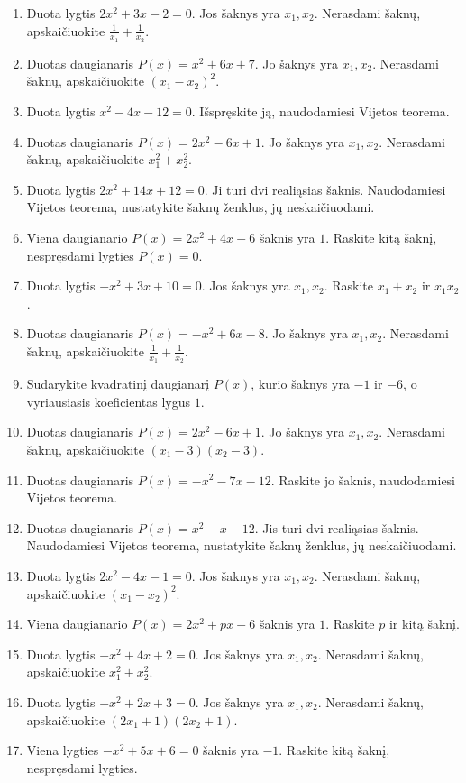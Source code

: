 \documentclass[11pt,a4paper]{article}
\begin{document}
\begin{enumerate}
\item Duota lygtis \(2x^2+3x-2=0\). Jos šaknys yra \(x_1,x_2\). Nerasdami šaknų, apskaičiuokite \mbox{\(\frac1{x_1}+\frac1{x_2}\)}.
\item Duotas daugianaris \(P(x)=x^2+6x+7\). Jo šaknys yra \(x_1,x_2\). Nerasdami šaknų, apskaičiuokite \mbox{\((x_1-x_2)^2\)}.
\item Duota lygtis \(x^2-4x-12=0\). Išspręskite ją, naudodamiesi Vijetos teorema.
\item Duotas daugianaris \(P(x)=2x^2-6x+1\). Jo šaknys yra \(x_1,x_2\). Nerasdami šaknų, apskaičiuokite \mbox{\(x_1^2+x_2^2\)}.
\item Duota lygtis \(2x^2+14x+12=0\). Ji turi dvi realiąsias šaknis. Naudodamiesi Vijetos teorema, nustatykite šaknų ženklus, jų neskaičiuodami.
\item Viena daugianario \(P(x)=2x^2+4x-6\) šaknis yra \(1\). Raskite kitą šaknį, nespręsdami lygties \(P(x)=0\).
\item Duota lygtis \(-x^2+3x+10=0\). Jos šaknys yra \(x_1,x_2\). Raskite \(x_1+x_2\) ir \(x_1x_2\).
\item Duotas daugianaris \(P(x)=-x^2+6x-8\). Jo šaknys yra \(x_1,x_2\). Nerasdami šaknų, apskaičiuokite \mbox{\(\frac1{x_1}+\frac1{x_2}\)}.
\item Sudarykite kvadratinį daugianarį \(P(x)\), kurio šaknys yra \(-1\) ir \(-6\), o vyriausiasis koeficientas lygus \(1\).
\item Duotas daugianaris \(P(x)=2x^2-6x+1\). Jo šaknys yra \(x_1,x_2\). Nerasdami šaknų, apskaičiuokite \mbox{\((x_1-3)(x_2-3)\)}.
\item Duotas daugianaris \(P(x)=-x^2-7x-12\). Raskite jo šaknis, naudodamiesi Vijetos teorema.
\item Duotas daugianaris \(P(x)=x^2-x-12\). Jis turi dvi realiąsias šaknis. Naudodamiesi Vijetos teorema, nustatykite šaknų ženklus, jų neskaičiuodami.
\item Duota lygtis \(2x^2-4x-1=0\). Jos šaknys yra \(x_1,x_2\). Nerasdami šaknų, apskaičiuokite \mbox{\((x_1-x_2)^2\)}.
\item Viena daugianario \(P(x)=2x^2+px-6\) šaknis yra \(1\). Raskite \(p\) ir kitą šaknį.
\item Duota lygtis \(-x^2+4x+2=0\). Jos šaknys yra \(x_1,x_2\). Nerasdami šaknų, apskaičiuokite \mbox{\(x_1^2+x_2^2\)}.
\item Duota lygtis \(-x^2+2x+3=0\). Jos šaknys yra \(x_1,x_2\). Nerasdami šaknų, apskaičiuokite \mbox{\((2x_1+1)(2x_2+1)\)}.
\item Viena lygties \(-x^2+5x+6=0\) šaknis yra \(-1\). Raskite kitą šaknį, nespręsdami lygties.

\end{enumerate}
\end{document}
